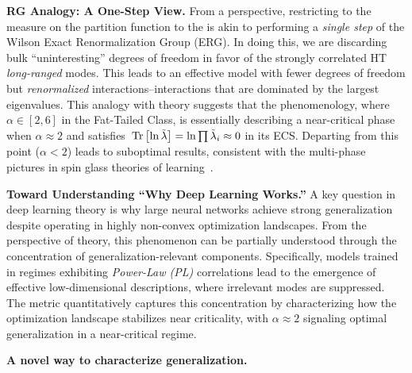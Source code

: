 \vspace{1em}
\noindent
\textbf{RG Analogy: A One-Step View.}
From a \RenormalizationGroup perspective, restricting to the measure on the partition function to
the \ECS is akin to performing a \emph{single step} of the Wilson Exact Renormalization Group (ERG).
In doing this, we are discarding bulk “uninteresting” degrees of freedom in favor of the strongly correlated 
HT \emph{long-ranged} modes. This leads to an effective model with fewer degrees of freedom but 
\emph{renormalized} interactions--interactions that are dominated by the largest eigenvalues.
This analogy with   \ERG theory suggests that the \HTSR phenomenology, where $\alpha\in[2,6]$ in the Fat-Tailed
\Universality Class, is essentially describing a near-critical phase  when
$\alpha \approx 2$ and satisfies $\mbox{}\operatorname{Tr}\left[\ln \tilde{\lambda}\right]=\ln\prod \tilde{\lambda}_i\approx 0$ in its ECS.
Departing from  this point ($\alpha<2$) leads to suboptimal results, consistent with the multi-phase 
pictures in \STATMECH spin glass theories of learning~\cite{SST92,Gardner_1988,Eng01, EB01_BOOK}.

\vspace{1em}
\noindent
\textbf{Toward Understanding “Why Deep Learning Works.”}
A key question in deep learning theory is why large neural networks achieve strong generalization despite operating in highly non-convex optimization landscapes. From the perspective of \ERG theory, this phenomenon can be partially understood through the concentration of generalization-relevant components. Specifically, models trained in regimes exhibiting \emph{Power-Law (PL)} correlations lead to the emergence of effective low-dimensional descriptions, where irrelevant modes are suppressed. The \WW \ALPHA metric quantitatively captures this concentration by characterizing how the optimization landscape stabilizes near criticality, with $\alpha \approx 2$ signaling optimal generalization in a near-critical regime.

\vspace{1em}
\noindent
\textbf{A novel way to characterize generalization.}

